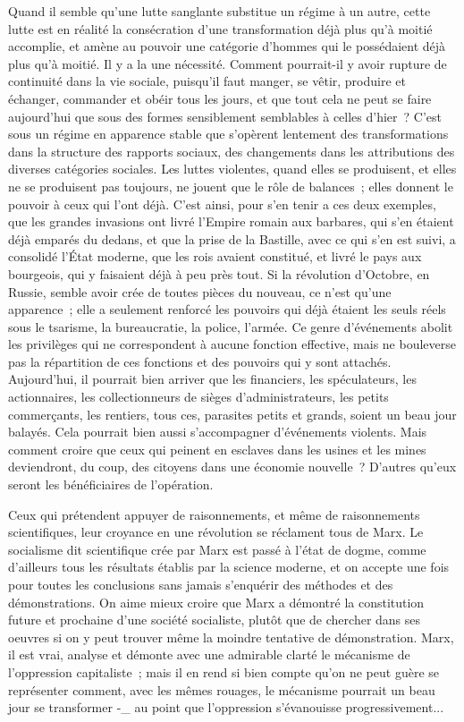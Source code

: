 \documentclass[french,twoside]{book} %
\begin{document}
Quand il semble qu'une lutte sanglante substitue un régime à un autre, cette lutte est en réalité la consécration d'une transformation déjà plus qu'à moitié accomplie, et amène au pouvoir une catégorie d'hommes qui le possédaient déjà plus qu'à moitié. Il y a la une nécessité. Comment pourrait-il y avoir rupture de continuité dans la vie sociale, puisqu'il faut manger, se vêtir, produire et échanger, commander et obéir tous les jours, et que tout cela ne peut se faire aujourd'hui que sous des formes sensiblement semblables à celles d'hier ? C'est sous un régime en apparence stable que s'opèrent lentement des transformations dans la structure des rapports sociaux, des changements dans les attributions des diverses catégories sociales. Les luttes violentes, quand elles se produisent, et elles ne se produisent pas toujours, ne jouent que le rôle de balances ; elles donnent le pouvoir à ceux qui l'ont déjà. C'est ainsi, pour s'en tenir a ces deux exemples, que les grandes invasions ont livré l'Empire romain aux barbares, qui s'en étaient déjà emparés du dedans, et que la prise de la Bastille, avec ce qui s'en est suivi, a consolidé l'État moderne, que les rois avaient constitué, et livré le pays aux bourgeois, qui y faisaient déjà à peu près tout. Si la révolution d'Octobre, en Russie, semble avoir crée de toutes pièces du nouveau, ce n'est qu'une apparence ; elle a seulement renforcé les pouvoirs qui déjà étaient les seuls réels sous le tsarisme, la bureaucratie, la police, l'armée. Ce genre d'événements abolit les privilèges qui ne correspondent à aucune fonction effective, mais ne bouleverse pas la répartition de ces fonctions et des pouvoirs qui y sont attachés. Aujourd'hui, il pourrait bien arriver que les financiers, les spéculateurs, les actionnaires, les collectionneurs de sièges d'administrateurs, les petits commerçants, les rentiers, tous ces, parasites petits et grands, soient un beau jour balayés. Cela pourrait bien aussi s'accompagner d'événements violents. Mais comment croire que ceux qui peinent en esclaves dans les usines et les mines deviendront, du coup, des citoyens dans une économie nouvelle ? D'autres qu'eux seront les bénéficiaires de l'opération.\par
Ceux qui prétendent appuyer de raisonnements, et même de raisonnements scientifiques, leur croyance en une révolution se réclament tous de Marx. Le socialisme dit scientifique crée par Marx est passé à l'état de dogme, comme d'ailleurs tous les résultats établis par la science moderne, et on accepte une fois pour toutes les conclusions sans jamais s'enquérir des méthodes et des démonstrations. On aime mieux croire que Marx a démontré la constitution future et prochaine d'une société socialiste, plutôt que de chercher dans ses oeuvres si on y peut trouver même la moindre tentative de démonstration. Marx, il est vrai, analyse et démonte avec une admirable clarté le mécanisme de l'oppression capitaliste ; mais il en rend si bien compte qu'on ne peut guère se représenter comment, avec les mêmes rouages, le mécanisme pourrait un beau jour se transformer -\_ au point que l'oppression s'évanouisse progressivement...\par
\end{document}
